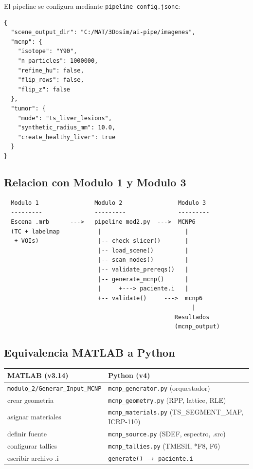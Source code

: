 \documentclass[12pt,a4paper]{article}
\begin{document}
El pipeline se configura mediante \texttt{pipeline\_config.jsonc}:

\begin{verbatim}
{
  "scene_output_dir": "C:/MAT/3Dosim/ai-pipe/imagenes",
  "mcnp": {
    "isotope": "Y90",
    "n_particles": 1000000,
    "refine_hu": false,
    "flip_rows": false,
    "flip_z": false
  },
  "tumor": {
    "mode": "ts_liver_lesions",
    "synthetic_radius_mm": 10.0,
    "create_healthy_liver": true
  }
}
\end{verbatim}

\subsection{Relacion con Modulo 1 y Modulo 3}

\begin{verbatim}
  Modulo 1                Modulo 2                Modulo 3
  ---------               ---------               ---------
  Escena .mrb      --->   pipeline_mod2.py  --->  MCNP6
  (TC + labelmap           |                        |
   + VOIs)                 |-- check_slicer()       |
                           |-- load_scene()         |
                           |-- scan_nodes()         |
                           |-- validate_prereqs()   |
                           |-- generate_mcnp()      |
                           |     +---> paciente.i   |
                           +-- validate()     --->  mcnp6
                                                      |
                                                 Resultados
                                                 (mcnp_output)
\end{verbatim}

\subsection{Equivalencia MATLAB a Python}

\begin{center}
\begin{tabular}{ll}
\toprule
\textbf{MATLAB (v3.14)} & \textbf{Python (v4)} \\
\midrule
\texttt{modulo\_2/Generar\_Input\_MCNP} & \texttt{mcnp\_generator.py} (orquestador) \\
\quad crear geometria & \texttt{mcnp\_geometry.py} (RPP, lattice, RLE) \\
\quad asignar materiales & \texttt{mcnp\_materials.py} (TS\_SEGMENT\_MAP, ICRP-110) \\
\quad definir fuente & \texttt{mcnp\_source.py} (SDEF, espectro, .src) \\
\quad configurar tallies & \texttt{mcnp\_tallies.py} (TMESH, *F8, F6) \\
\quad escribir archivo .i & \texttt{generate()} $\to$ \texttt{paciente.i} \\
\bottomrule
\end{tabular}
\end{center}
\end{document}
